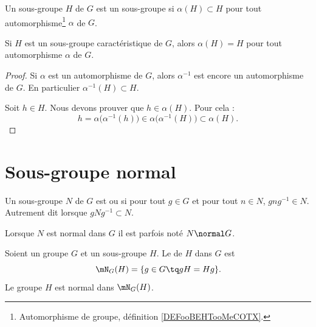 \begin{definition}      \label{DEFooUXXTooCCLmQe}
	Un sous-groupe \( H\) de \( G\) est un sous-groupe  si \( \alpha(H)\subset H\) pour tout automorphisme\footnote{Automorphisme de groupe, définition \ref{DEFooBEHTooMeCOTX}.} \( \alpha\) de \( G\).
\end{definition}

\begin{lemma}
	Si \( H\) est un sous-groupe caractéristique de \( G\), alors \( \alpha(H)=H\) pour tout automorphisme \( \alpha\) de \( G\).
\end{lemma}

\begin{proof}
	Si \( \alpha\) est un automorphisme de \( G\), alors \( \alpha^{-1}\) est encore un automorphisme de \( G\). En particulier \( \alpha^{-1}(H)\subset H\).

	Soit \( h\in H\). Nous devons prouver que \( h\in \alpha(H)\). Pour cela :
	\begin{equation}
		h=\alpha\big( \alpha^{-1}(h) \big)\in \alpha\big( \alpha^{-1}(H) \big)\subset\alpha(H).
	\end{equation}
\end{proof}

\section{Sous-groupe normal}



\begin{definition}                      \label{DEFooNIIMooFkZgvX}
	Un sous-groupe \( N\) de \( G\) est  ou  si pour tout \( g\in G\) et pour tout \( n\in N\), \( gng^{-1}\in N\). Autrement dit lorsque \( gNg^{-1}\subset N\).

	Lorsque \( N\) est normal dans \( G\) il est parfois noté \( N\normal G\).
\end{definition}

\begin{propositionDef}          \label{DEFooZTSMooBislIy}
	Soient un groupe \( G\) et un sous-groupe \( H\). Le  de \( H\) dans \( G\) est
	\begin{equation}
		\mN_G(H)=\{ g\in G\tq gH=Hg \}.
	\end{equation}
	Le groupe \( H\) est normal dans \( \mN_G(H)\).
\end{propositionDef}

